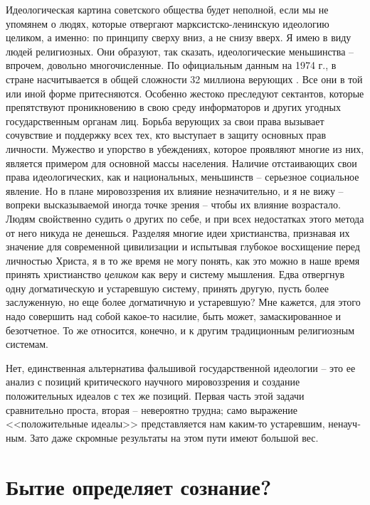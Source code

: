 \documentclass{book}
\begin{document}
Идеологическая картина советского общества будет непол­ной, если мы не упомянем о людях, которые отвергают марксистско-ленинскую 
идеологию целиком, а именно: по принци­пу сверху вниз, а не снизу вверх. Я имею в виду людей религи­озных. Они образуют, так 
сказать, идеологические меньшинст­ва -- впрочем, довольно многочисленные. По официальным данным на 1974 г., в стране 
насчитывается в общей сложно­сти 32 миллиона верующих%
.
Все они в той или иной форме притесняются. Особенно жестоко преследуют 
сектантов, кото­рые препятствуют проникновению в свою среду информато­ров и других угодных государственным органам лиц. Борьба 
верующих за свои права вызывает сочувствие и поддержку всех тех, кто выступает в защиту основных прав личности. Мужество и 
упорство в убеждениях, которое проявляют мно­гие из них, является примером для основной массы населения. Наличие отстаивающих 
свои права идеологических, как и на­циональных, меньшинств -- серьезное социальное явление. Но в плане мировоззрения их влияние 
незначительно, и я не вижу -- вопреки высказываемой иногда точке зрения -- чтобы их влияние возрастало. Людям свойственно судить 
о других по себе, и при всех недостатках этого метода от него никуда не денешься. Разделяя многие идеи христианства, признавая 
их значение для современной цивилизации и испытывая глубокое восхищение перед личностью Христа, я в то же время не могу по­нять, 
как это можно в наше время принять христианство \textit{цели­ком} как веру и систему мышления. Едва отвергнув одну догма­тическую 
и устаревшую систему, принять другую, пусть более заслуженную, но еще более догматичную и устаревшую? Мне кажется, для этого 
надо совершить над собой какое-то наси­лие, быть может, замаскированное и безотчетное. То же относится, конечно, и к другим 
традиционным религиозным системам.

Нет, единственная альтернатива фальшивой государственной идеологии -- это ее анализ с позиций критического научного 
мировоззрения и создание положительных идеалов с тех же позиций. Первая часть этой задачи сравнительно проста, вто­рая -- 
невероятно трудна; само выражение <<положительные идеалы>> представляется нам каким-то устаревшим, ненауч­ным. Зато даже скромные 
результаты на этом пути имеют большой вес.



\section{Бытие определяет сознание?}
\end{document}
